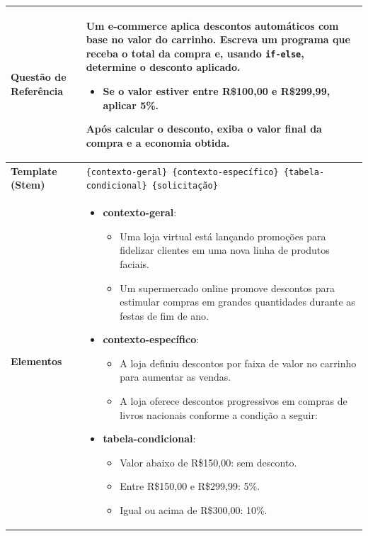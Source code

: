 \begin{table}[htbp]
\centering
\begin{tabular}{|l|p{10cm}|}
\hline
\textbf{Questão de Referência} 
& Um e-commerce aplica descontos automáticos com base no valor do carrinho. Escreva um programa que receba o total da compra e, usando \texttt{if-else}, determine o desconto aplicado.  
\begin{itemize}
    \item Se o valor estiver entre R\$100,00 e R\$299,99, aplicar 5\%.
\end{itemize}
Após calcular o desconto, exiba o valor final da compra e a economia obtida. \\
\hline

\textbf{Template (Stem)} 
& \texttt{\{contexto-geral\} \{contexto-específico\} \{tabela-condicional\} \{solicitação\}} \\
\hline

\textbf{Elementos} 
& 
\begin{itemize}[leftmargin=1em]
  \item \textbf{contexto-geral}:
    \begin{itemize}[leftmargin=1em]
      \item Uma loja virtual está lançando promoções para fidelizar clientes em uma nova linha de produtos faciais.
      \item Um supermercado online promove descontos para estimular compras em grandes quantidades durante as festas de fim de ano.
    \end{itemize}

  \item \textbf{contexto-específico}:
    \begin{itemize}[leftmargin=1em]
      \item A loja definiu descontos por faixa de valor no carrinho para aumentar as vendas.
      \item A loja oferece descontos progressivos em compras de livros nacionais conforme a condição a seguir:
    \end{itemize}

  \item \textbf{tabela-condicional}:
    \begin{itemize}[leftmargin=1em]
      \item Valor abaixo de R\$150,00: sem desconto.
      \item Entre R\$150,00 e R\$299,99: 5\%.
      \item Igual ou acima de R\$300,00: 10\%.
    \end{itemize}


\end{itemize}
\end{tabular}
\end{table}
